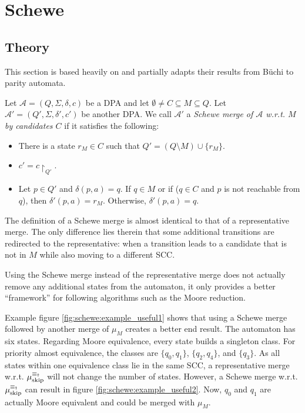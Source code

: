 
\chapter{Schewe}
\label{chap:schewe}

\section{Theory}

This section is based heavily on \cite{Schewe2010} and partially adapts their results from B\"uchi to parity automata.

\begin{defn}
		Let $\mathcal{A} = (Q, \Sigma, \delta, c)$ be a DPA and let $\emptyset \neq C \subseteq M \subseteq Q$. Let $\mathcal{A}' = (Q', \Sigma, \delta', c')$ be another DPA. We call $\mathcal{A}'$ a \emph{Schewe merge of $\mathcal{A}$ w.r.t. $M$ by candidates $C$} if it satisfies the following:
	\begin{itemize}
		\item There is a state $r_M \in C$ such that $Q' = (Q \setminus M) \cup \{r_M\}$.
		\item $c' = c\upharpoonright_{Q'}$.
		\item Let $p \in Q'$ and $\delta(p, a) = q$. If $q \in M$ or if ($q \in C$ and $p$ is not reachable from $q$), then $\delta'(p, a) = r_M$. Otherwise, $\delta'(p, a) = q$. 
	\end{itemize}
\end{defn}

The definition of a Schewe merge is almost identical to that of a representative merge. The only difference lies therein that some additional transitions are redirected to the representative: when a transition leads to a candidate that is not in $M$ while also moving to a different SCC.

Using the Schewe merge instead of the representative merge does not actually remove any additional states from the automaton, it only provides a better \enquote{framework} for following algorithms such as the Moore reduction. 

Example figure \ref{fig:schewe:example_useful1} shows that using a Schewe merge followed by another merge of $\mu_M$ creates a better end result. The automaton has six states. Regarding Moore equivalence, every state builds a singleton class. For priority almost equivalence, the classes are $\{q_0, q_1\}$, $\{q_2, q_4\}$, and $\{q_3\}$. As all states within one equivalence class lie in the same SCC, a representative merge w.r.t. $\mu_\text{skip}^{\equiv_\text{\Ankh}}$ will not change the number of states. However, a Schewe merge w.r.t. $\mu_\text{skip}^{\equiv_\text{\Ankh}}$ can result in figure \ref{fig:schewe:example_useful2}. Now, $q_0$ and $q_1$ are actually Moore equivalent and could be merged with $\mu_M$.

